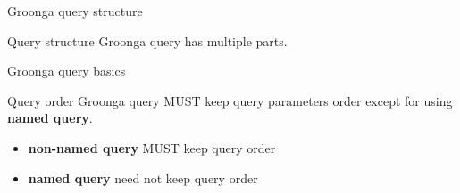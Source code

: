 \documentclass[12pt, unicode]{beamer}
\begin{document}
\begin{frame}{Groonga query structure}
\begin{block}{Query structure}
Groonga query has multiple parts.
\end{block}
\begin{table}[htb]
\end{table}
\end{frame}

\begin{frame}{Groonga query basics}
\begin{block}{Query order}
Groonga query MUST keep query parameters order except for using \textbf {named query}.
\end{block}
\begin{itemize}
\item<2-> \textbf {non-named query} MUST keep query order
\item<3-> \textbf {named query} need not keep query order
\end{itemize}
\end{frame}
\end{document}
